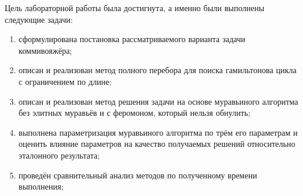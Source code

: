 
Цель лабораторной работы была достигнута, а именно были выполнены следующие задачи:
\begin{enumerate}
	\item сформулирована постановка рассматриваемого варианта задачи коммивояжёра;
	\item описан и реализован метод полного перебора для поиска гамильтонова цикла с ограничением по длине;
	\item описан и реализован метод решения задачи на основе муравьиного алгоритма без элитных муравьёв и с феромоном, который нельзя обнулить;
	\item выполнена параметризация муравьиного алгоритма по трём его параметрам и оценить влияние параметров на качество получаемых решений относительно эталонного результата;
	\item проведён сравнительный анализ методов по полученному времени выполнения;
	
\end{enumerate}

